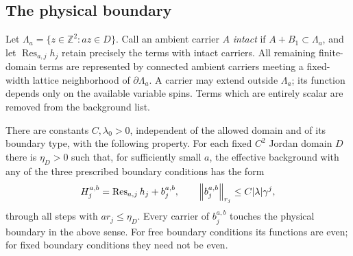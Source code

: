 \subsection{The physical boundary}

Let $\Lambda_a=\{z\in\mathbb Z^2:az\in D\}$.  Call an ambient
carrier $A$ \emph{intact} if $A+B_1\subset\Lambda_a$, and let
$\operatorname{Res}_{a,j}h_j$ retain precisely the terms with intact
carriers.  All remaining finite-domain terms are represented by
connected ambient carriers meeting a fixed-width lattice neighborhood
of $\partial\Lambda_a$.  A carrier may extend outside $\Lambda_a$;
its function depends only on the available variable spins.  Terms
which are entirely scalar are removed from the background list.

\begin{proposition}\label{flow:boundary}
There are constants $C,\lambda_0>0$, independent of the allowed domain
and of its boundary type, with the following property.  For each fixed
$C^2$ Jordan domain $D$ there is $\eta_D>0$ such that, for sufficiently
small $a$, the effective background with any of the three prescribed
boundary conditions has the form
\begin{equation}\label{flow:domain-decomposition}
       H_j^{a,b}=\operatorname{Res}_{a,j}h_j+b_j^{a,b},
       \qquad \left\|b_j^{a,b}\right\|_{r_j}
                       \le C|\lambda|\gamma^j,
\end{equation}
through all steps with $ar_j\le\eta_D$.
Every carrier of $b_j^{a,b}$ touches the physical boundary in the
above sense.  For free boundary conditions its functions are even;
for fixed boundary conditions they need not be even.
\end{proposition}

